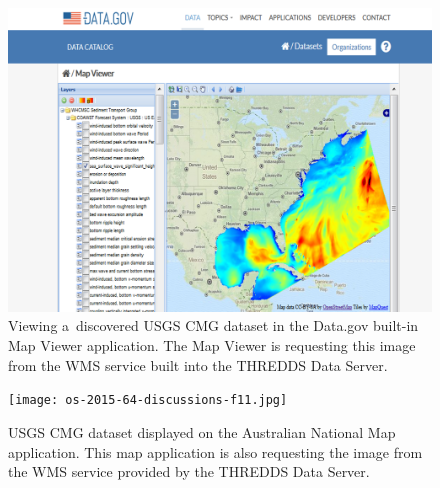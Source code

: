 \documentclass[osd, online, hvmath]{copernicus}
\begin{document}
\begin{figure}
\includegraphics[width=140mm]{os-2015-64-discussions-f10.png}
\caption{Viewing a~discovered USGS CMG dataset in the Data.gov
  built-in Map Viewer application. The Map Viewer is requesting this
  image from the WMS service built into the THREDDS Data Server. }
\label{osd-2015-0064-f10.pdf}
\end{figure}

\begin{figure}
\texttt{[image: os-2015-64-discussions-f11.jpg]}
\caption{USGS CMG dataset displayed on the Australian National Map
  application. This map application is also requesting the image from
  the WMS service provided by the THREDDS Data Server.}
\label{osd-2015-0064-f11.pdf}
\end{figure}
\end{document}
